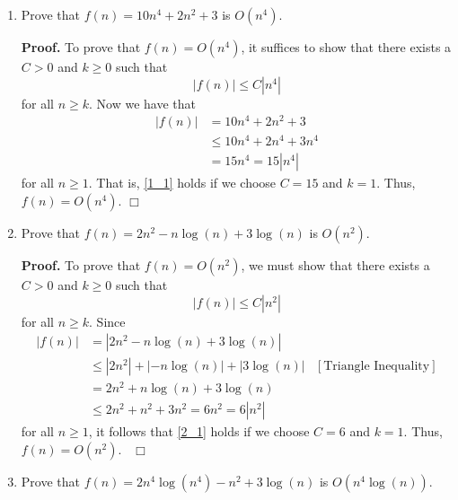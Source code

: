 \documentclass[9pt]{article}
\newcommand{\qed}{\hfill \ensuremath{\Box}}
\begin{document}
\begin{enumerate}
   \item Prove that $f(n) = 10n^4 + 2n^2 + 3$ is $O(n^4)$.

      \textbf{Proof.} To prove that $f(n) = O(n^4)$, it suffices to show that 
      there exists a $C > 0$ and $k \ge 0$ such that
      \begin{equation} \label{1_1}
         |f(n)| \le C|n^4|
      \end{equation}
      for all $n \ge k$. Now we have that
      \begin{align*}
         |f(n)| &= 10n^4 + 2n^2 + 3 \\
            &\le 10n^4 + 2n^4 + 3n^4 \\
            &= 15n^4 = 15|n^4|
      \end{align*}
      for all $n \ge 1$. That is, \eqref{1_1} holds if we choose $C = 15$ and
      $k = 1$. Thus, $f(n) = O(n^4)$. \qed
   \item Prove that $f(n) = 2n^2 - n\log(n) + 3\log(n)$ is $O(n^2)$.

      \textbf{Proof.} To prove that $f(n) = O(n^2)$, we must show that there
      exists a $C > 0$ and $k \ge 0$ such that
      \begin{equation} \label{2_1}
         |f(n)| \le C|n^2|
      \end{equation}
      for all $n \ge k$. Since
      \begin{align*}
         |f(n)| &= |2n^2 - n\log(n) + 3\log(n)| \\
                &\le |2n^2| + |-n\log(n)| + |3\log(n)|
                   &[\text{Triangle Inequality}] \\
                &= 2n^2 + n\log(n) + 3\log(n) \\
                &\le 2n^2 + n^2 + 3n^2 = 6n^2 = 6|n^2|
      \end{align*}
      for all $n \ge 1$, it follows that \eqref{2_1} holds if we choose
      $C = 6$ and $k = 1$. Thus, $f(n) = O(n^2)$. \mbox{ }\qed
   \item Prove that $f(n) = 2n^4\log(n^4) - n^2 + 3\log(n)$ is $O(n^4\log(n))$.


\end{enumerate}
\end{document}
